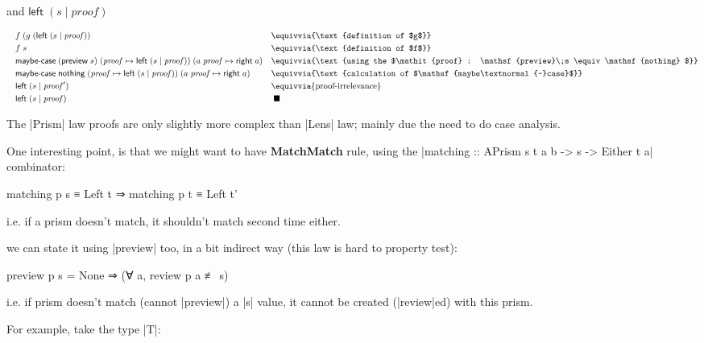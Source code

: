 \documentclass{article}
\begin{document}
and $\mathsf{left}\;(s \mid \mathit{proof})$

\begin{equation}
\begin{aligned}
  \quad & f\; (g\; (\mathsf{left}\;(s \mid \mathit{proof}))       &&\equivvia{\text{definition of $g$}} \\
      & f\; s                                          &&\equivvia{\text{definition of $f$}}  \\
      & \mathsf{maybe\textnormal{-}case}\;(\mathsf{preview}\;s)\; (\mathit{proof} \mapsto \mathsf{left}\;(s \mid \mathit{proof}))\; (a\; \mathit{proof} \mapsto \mathsf{right}\; a)
                                                       &&\equivvia{\text{using the $\mathit{proof} : \mathsf{preview}\;s \equiv \mathsf{nothing} $}} \\
      & \mathsf{maybe\textnormal{-}case}\;\mathsf{nothing}\; (\mathit{proof} \mapsto \mathsf{left}\;(s \mid \mathit{proof}))\; (a\; \mathit{proof} \mapsto \mathsf{right}\; a)
                                               &&\equivvia{\text{calculation of $\mathsf{maybe\textnormal{-}case}$}} \\
      & \mathsf{left}\;(s \mid \mathit{proof}') && \equivvia{\text{proof-irrelevance}} \\
      & \mathsf{left}\;(s \mid \mathit{proof}) &&\;\blacksquare
\end{aligned}
\end{equation}

The |Prism| law proofs are only slightly more complex than |Lens| law;
mainly due the need to do case analysis.

One interesting point, is that we might want to have \textbf{MatchMatch} rule,
using the |matching :: APrism s t a b -> s -> Either t a| combinator:
\begin{code}
matching p s ≡ Left t ⇒ matching p t ≡ Left t'
\end{code}
i.e. if a prism doesn't match, it shouldn't match second time either.

we can state it using |preview| too, in a bit indirect way
(this law is hard to property test):

\begin{code}
preview p s = None ⇒ (∀ a, review p a ≢ s)
\end{code}
i.e. if prism doesn't match (cannot |preview|) a |s| value,
it cannot be created (|review|ed) with this prism.

For example, take the type |T|:
\end{document}
